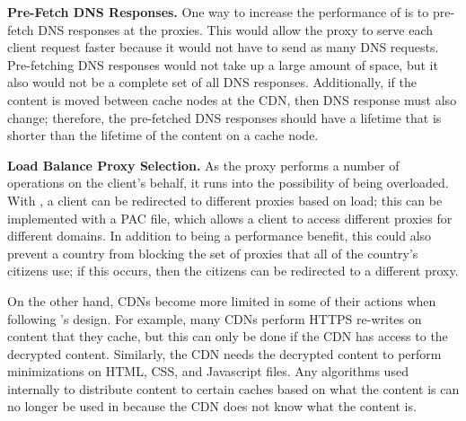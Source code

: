 {\bf Pre-Fetch DNS Responses.} One way to increase the performance of \system{} is to pre-fetch DNS responses at 
the proxies.  This would allow the proxy to serve each client request faster because it would not have to send 
as many DNS requests.  Pre-fetching DNS responses would not take up a large amount of space, but it also 
would not be a complete set of all DNS responses.  Additionally, if the content is moved between cache nodes 
at the CDN, then DNS response must also change; therefore, the pre-fetched DNS responses should have a 
lifetime that is shorter than the lifetime of the content on a cache node.

{\bf Load Balance Proxy Selection.} As the proxy performs a number of operations on the client's behalf, it 
runs into the possibility of being overloaded.  With \system{}, a client can be redirected to different 
proxies based on load; this can be implemented with a PAC file, which allows 
a client to access different proxies for different domains.  In addition to being a performance benefit, 
this could also prevent a country from blocking the set of proxies that all of the country's citizens use; if 
this occurs, then the citizens can be redirected to a different proxy.   

On the other hand, CDNs become more limited in some of their actions when following \system{}'s design.  For example, 
many CDNs perform HTTPS re-writes on content that they cache, but this can only be done if the CDN has access to the 
decrypted content.  Similarly, the CDN needs the decrypted content to perform minimizations on HTML, CSS, and Javascript 
files.  Any algorithms used internally to distribute content to certain caches based on what the content is can no longer 
be used in \system{} because the CDN does not know what the content is. 
